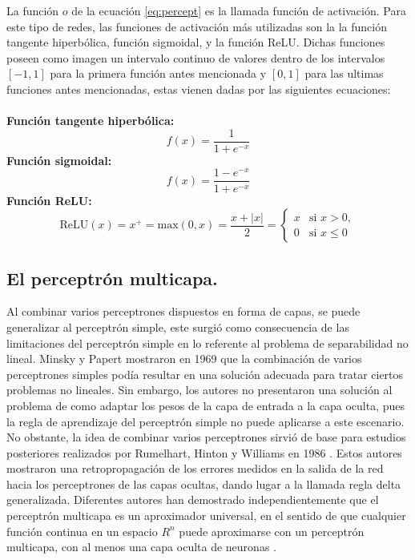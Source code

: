 \documentclass[12pt,letterpaper,oneside,openright]{book}
\begin{document}
	La función $o$ de la ecuación \ref{eq:percept} es la llamada función de activación. Para este tipo de redes, las funciones de activación más utilizadas son la la función tangente hiperbólica, función sigmoidal, y la función ReLU. Dichas funciones poseen como imagen un intervalo continuo de valores dentro de los intervalos $[-1,1]$ para la primera función antes mencionada y $[0,1]$ para las ultimas funciones antes mencionadas, estas vienen dadas por las siguientes ecuaciones: \\ \\
	\textbf{Función tangente hiperbólica:}
	\begin{equation}
		\label{eq:tangente_hiper}
		f(x) = \frac{1}{1 + e^{-x}}
	\end{equation}
	\textbf{Función sigmoidal:}
	\begin{equation}
		\label{eq:sigmoidal}
		f(x) = \frac{1-e^{-x}}{1 + e^{-x}}
	\end{equation}
	\textbf{Función ReLU:}
	\begin{equation}
		\label{eq:ReLU}
		\mathrm{ReLU}(x) = x^{+} = \mathrm{max}(0,x) = \frac{x + |x|}{2} = \left\{\begin{array}{lll}
			x & \text{si } x > 0, \\
			0 & \text{si } x \leq 0
		\end{array}\right.
	\end{equation}
	
	\subsection{El perceptrón multicapa.}
	Al combinar varios perceptrones dispuestos en forma de capas, se puede generalizar al perceptrón simple, este surgió como consecuencia de las limitaciones del perceptrón simple en lo referente al problema de separabilidad no lineal. Minsky y Papert mostraron en 1969 que la combinación de varios perceptrones simples podía resultar en una solución adecuada para tratar ciertos problemas no lineales. Sin embargo, los autores no presentaron una solución al problema de como adaptar los pesos de la capa de entrada a la capa oculta, pues la regla de aprendizaje del perceptrón simple no puede aplicarse a este escenario. No obstante, la idea de combinar varios perceptrones sirvió de base para estudios posteriores realizados por Rumelhart, Hinton y Williams en 1986 \cite{percepMulti}. Estos autores mostraron una retropropagación de los errores medidos en la salida de la red hacia los perceptrones de las capas ocultas, dando lugar a la llamada regla delta generalizada. Diferentes autores han demostrado independientemente que el perceptrón multicapa es un aproximador universal, en el sentido de que cualquier función continua en un espacio $R^n$ puede aproximarse con un perceptrón multicapa, con al menos una capa oculta de neuronas \cite{stephani}.
 
\end{document}

